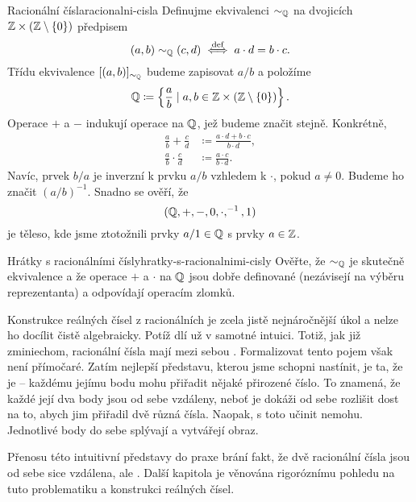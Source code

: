 \begin{definition}{Racionální čísla}{racionalni-cisla}
 Definujme ekvivalenci $ \sim _{\mathbb{Q}}$ na dvojicích $\mathbb{Z} \times (\mathbb{Z} \setminus
 \{0\})$ předpisem
 \[
  (a,b) \sim _{\mathbb{Q}}(c,d) \overset{\text{def}}{\iff} a \cdot d = b
  \cdot c.
 \]
 Třídu ekvivalence $[(a,b)]_{ \sim _{\mathbb{Q}}}$ budeme zapisovat $a / b$ a položíme
 \[
  \mathbb{Q} \coloneqq \left\{ \frac{a}{b} \mid a,b \in \mathbb{Z} \times (\mathbb{Z} \setminus \{0\})
  \right\}.
 \]
 Operace $+$ a $-$ indukují operace na $\mathbb{Q}$, jež budeme značit stejně.
 Konkrétně,
 \begin{align*}
  \frac{a}{b} + \frac{c}{d} &\coloneqq \frac{a \cdot d+b \cdot c}{b \cdot d},\\
  \frac{a}{b} \cdot \frac{c}{d} & \coloneqq \frac{a \cdot c}{b \cdot d}.
 \end{align*}
 Navíc, prvek $b / a$ je inverzní k prvku $a / b$ vzhledem k $ \cdot $, pokud
 $a \neq 0$. Budeme ho značit $(a / b)^{-1}$. Snadno se ověří, že
 \[
  (\mathbb{Q},+,-,0, \cdot,^{-1},1)
 \]
 je těleso, kde jsme ztotožnili prvky $a / 1 \in \mathbb{Q}$ s prvky $a \in \mathbb{Z}$.
\end{definition}

\begin{exercise}{Hrátky s racionálními čísly}{hratky-s-racionalnimi-cisly}
 Ověřte, že $ \sim _{\mathbb{Q}}$ je skutečně ekvivalence a že operace $+$ a $ \cdot $
 na $\mathbb{Q}$ jsou dobře definované (nezávisejí na výběru reprezentanta) a odpovídají
  operacím zlomků.
\end{exercise}

Konstrukce reálných čísel z racionálních je zcela jistě nejnáročnější úkol a
nelze ho docílit čistě algebraicky. Potíž dlí už v samotné intuici. Totiž, jak
již zminiechom, racionální čísla mají mezi sebou . Formalizovat tento
pojem však není přímočaré. Zatím nejlepší představu, kterou jsme schopni
nastínit, je ta, že  je  -- každému jejímu
bodu mohu přiřadit nějaké přirozené číslo. To znamená, že každé její dva body
jsou od sebe vzdáleny, neboť je dokáži od sebe rozlišit dost na to, abych jim
přiřadil dvě různá čísla. Naopak, s  toto učinit nemohu.
Jednotlivé body do sebe splývají a vytvářejí  obraz.

Přenosu této intuitivní představy do praxe brání fakt, že dvě racionální čísla
jsou od sebe sice vzdálena, ale . Další kapitola je věnována
rigoróznímu pohledu na tuto problematiku a konstrukci reálných čísel.
